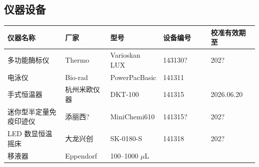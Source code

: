 \documentclass[UTF8,10pt,a4paper,fontset=fandol]{ctexart}
\newcommand{\fieldvalue}[1]{#1}
\newcommand{\handwritten}[1]{#1}
\begin{document}
\subsection{仪器设备}

\begin{center}
\small
\begin{tabular}{|p{0.23\linewidth}|p{0.18\linewidth}|p{0.21\linewidth}|p{0.19\linewidth}|p{0.19\linewidth}|}
\hline
\textbf{仪器名称} & \textbf{厂家} & \textbf{型号} & \textbf{设备编号} & \textbf{校准有效期至} \\
\hline
多功能酶标仪 & Thermo & Varioskan LUX &
\fieldvalue{\handwritten{143130?}} &
\fieldvalue{\handwritten{202?}} \\
\hline
电泳仪 & Bio-rad & PowerPacBasic &
\fieldvalue{\handwritten{141311}} & \\
\hline
手式恒温器 & 杭州米欧仪器 & DKT-100 &
\fieldvalue{\handwritten{141315}} &
\fieldvalue{\handwritten{2026.06.20}} \\
\hline
迷你型半定量免疫印迹仪 & 添丽西? & MiniChemi610 &
\fieldvalue{\handwritten{141315?}} &
\fieldvalue{\handwritten{202?}} \\
\hline
LED 数显恒温摇床 & 大龙兴创 & SK-0180-S &
\fieldvalue{\handwritten{141318}} &
\fieldvalue{\handwritten{202?}} \\
\hline
\multirow{5}{*}{移液器} & \multirow{5}{*}{Eppendorf} &
\fieldvalue{\handwritten{100--1000 $\mu$L}} &

\end{tabular}
\end{center}
\end{document}
